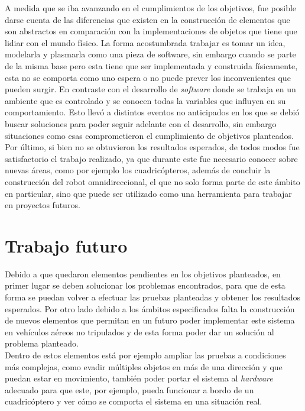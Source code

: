 \documentclass{iccmemoria}
\begin{document}
A medida que se iba avanzando en el cumplimientos de los objetivos, fue posible darse cuenta de las diferencias que existen en la construcción de elementos que son abstractos en comparación con la implementaciones de objetos que tiene que lidiar con el mundo físico. La forma acostumbrada trabajar es tomar un idea, modelarla y plasmarla como una pieza de software, sin embargo cuando se parte de la misma base pero esta tiene que ser implementada y construida físicamente, esta no se comporta como uno espera o no puede prever los inconvenientes que pueden surgir. En contraste con el desarrollo de \emph{software} donde se trabaja en un ambiente que es controlado y se conocen todas la variables que influyen en su comportamiento. Esto llevó a distintos eventos no anticipados en los que se debió buscar soluciones para poder seguir adelante con el desarrollo, sin embargo situaciones como esas comprometieron el cumplimiento de objetivos planteados.\\

Por último, si bien no se obtuvieron los resultados esperados, de todos modos fue satisfactorio el trabajo realizado, ya que durante este fue necesario conocer sobre nuevas áreas, como por ejemplo los cuadricópteros, además de concluir la construcción del robot omnidireccional, el que no solo forma parte de este ámbito en particular, sino que puede ser utilizado como una herramienta para trabajar en proyectos futuros.\\

\section{Trabajo futuro}

Debido a que quedaron elementos pendientes en los objetivos planteados, en primer lugar se deben solucionar los problemas encontrados, para que de esta forma se puedan volver a efectuar las pruebas planteadas y obtener los resultados esperados. Por otro lado debido a los ámbitos especificados falta la construcción de nuevos elementos que permitan en un futuro poder implementar este sistema en vehículos aéreos no tripulados y de esta forma poder dar un solución al problema planteado.\\

Dentro de estos elementos está por ejemplo ampliar las pruebas a condiciones más complejas, como evadir múltiples objetos en más de una dirección y que puedan estar en movimiento, también poder portar el sistema al \emph{hardware} adecuado para que este, por ejemplo, pueda funcionar a bordo de un cuadricóptero y ver cómo se comporta el sistema en una situación real.\\
\end{document}

